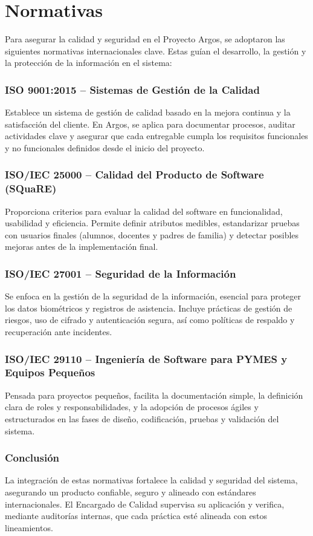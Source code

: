 \section{Normativas}

Para asegurar la calidad y seguridad en el Proyecto Argos, se adoptaron las siguientes normativas internacionales clave. Estas guían el desarrollo, la gestión y la protección de la información en el sistema:

\subsubsection*{ISO 9001:2015 – Sistemas de Gestión de la Calidad}
Establece un sistema de gestión de calidad basado en la mejora continua y la satisfacción del cliente. En Argos, se aplica para documentar procesos, auditar actividades clave y asegurar que cada entregable cumpla los requisitos funcionales y no funcionales definidos desde el inicio del proyecto.

\subsubsection*{ISO/IEC 25000 – Calidad del Producto de Software (SQuaRE)}
Proporciona criterios para evaluar la calidad del software en funcionalidad, usabilidad y eficiencia. Permite definir atributos medibles, estandarizar pruebas con usuarios finales (alumnos, docentes y padres de familia) y detectar posibles mejoras antes de la implementación final.

\subsubsection*{ISO/IEC 27001 – Seguridad de la Información}
Se enfoca en la gestión de la seguridad de la información, esencial para proteger los datos biométricos y registros de asistencia. Incluye prácticas de gestión de riesgos, uso de cifrado y autenticación segura, así como políticas de respaldo y recuperación ante incidentes.

\subsubsection*{ISO/IEC 29110 – Ingeniería de Software para PYMES y Equipos Pequeños}
Pensada para proyectos pequeños, facilita la documentación simple, la definición clara de roles y responsabilidades, y la adopción de procesos ágiles y estructurados en las fases de diseño, codificación, pruebas y validación del sistema.

\subsubsection*{Conclusión}
La integración de estas normativas fortalece la calidad y seguridad del sistema, asegurando un producto confiable, seguro y alineado con estándares internacionales. El Encargado de Calidad supervisa su aplicación y verifica, mediante auditorías internas, que cada práctica esté alineada con estos lineamientos.
